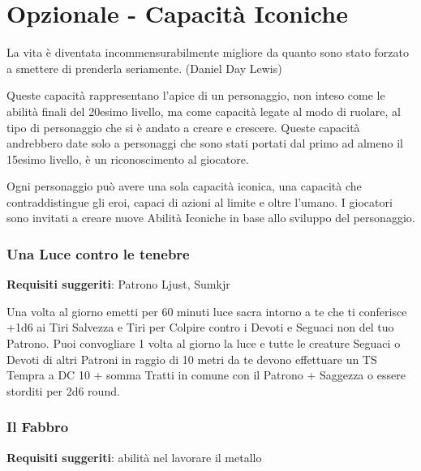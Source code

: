 \section{Opzionale - Capacità Iconiche}\hypertarget{abilitaiconiche}{}\label{abilitaiconiche}

\begin{enfasi}{
La vita è diventata incommensurabilmente migliore da quanto sono stato forzato a smettere di prenderla seriamente. (Daniel Day Lewis)
}\end{enfasi}

\begin{multicols}{2}


Queste capacità rappresentano l'apice di un personaggio, non inteso come le abilità finali del 20esimo livello, ma come capacità legate al modo di ruolare, al tipo di personaggio che si è andato a creare e crescere. Queste capacità andrebbero date solo a personaggi che sono stati portati dal primo ad almeno il 15esimo livello, è un riconoscimento al giocatore.

Ogni personaggio può avere una sola capacità iconica, una capacità che contraddistingue gli eroi, capaci di azioni al limite e oltre l'umano. I giocatori sono invitati a creare nuove Abilità Iconiche in base allo sviluppo del personaggio.

\medskip

\subsubsection{Una Luce contro le tenebre}

\textbf{Requisiti suggeriti}: Patrono Ljust, Sumkjr

Una volta al giorno emetti per 60 minuti luce sacra intorno a te che ti conferisce +1d6 ai Tiri Salvezza e Tiri per Colpire contro i Devoti e Seguaci non del tuo Patrono. Puoi convogliare 1 volta al giorno la luce e tutte le creature Seguaci o Devoti di altri Patroni in raggio di 10 metri da te devono effettuare un TS Tempra a DC 10 + somma Tratti in comune con il Patrono + Saggezza o essere storditi per 2d6 round.

\subsubsection{Il Fabbro}

\textbf{Requisiti suggeriti}: abilità nel lavorare il metallo


\end{multicols}
